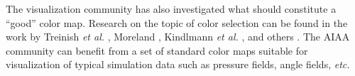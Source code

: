 The visualization community has also investigated what should constitute a ``good'' color map. Research on the topic of color selection can be found in the work by Treinish \emph{et al.} \cite{treinishshould}, Moreland \cite{paraview}, Kindlmann \emph{et al.} \cite{GLK:facelum02}, and others \cite{macdonald1999using,Tominski:2008bt}. The AIAA community can benefit from a set of standard color maps suitable for visualization of typical simulation data such as pressure fields, angle fields, {\em etc.}




